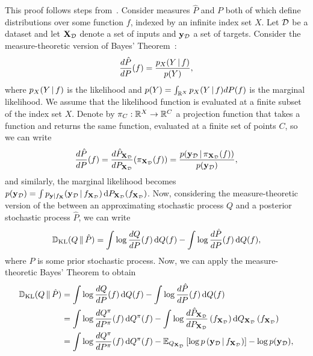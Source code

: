 \begin{appendices}
This proof follows steps from~\citet{matthews2016kld}.
Consider measures $\hat{P}$ and $P$ both of which define distributions over some function $f$, indexed by an infinite index set $X$.
Let $\mathcal{D}$ be a dataset and let $\mathbf X_{\mathcal{D}}$ denote a set of inputs and $\mathbf y_{\mathcal{D}}$ a set of targets.
Consider the measure-theoretic version of Bayes' Theorem~\citep{schervish1995theory}:
\begin{align}
    \frac{d \hat{P}}{d P}(f)=\frac{p_{X}(Y \,|\, f)}{p(Y)},
\end{align}
where $p_{X}(Y \,|\, f)$ is the likelihood and $p(Y) = \int_{\mathbb{R}^X} p_{X}(Y \,|\, f) dP(f)$ is the marginal likelihood.
We assume that the likelihood function is evaluated at a finite subset of the index set $X$.
Denote by $\pi_{C}: \mathbb{R}^{X} \to \mathbb{R}^{C}$ a projection function that takes a function and returns the same function, evaluated at a finite set of points $C$, so we can write
\begin{align}
    \frac{d \hat{P}}{d P}(f)
    =
    \frac{d \hat{P}_{\mathbf X_{\mathcal{D}}}}{d P_{\mathbf X_{\mathcal{D}}}}(\pi_{\mathbf X_{\mathcal{D}}}(f))
    =
    \frac{p(\mathbf y_{\mathcal{D}} \,|\, \pi_{\mathbf X_{\mathcal{D}}}(f))}{p(\mathbf y_{\mathcal{D}})},
\end{align}
and similarly, the marginal likelihood becomes $p(\mathbf y_{\mathcal{D}}) = \int p_{\mathbf y | f_{\mathbf X}}(\mathbf y_{\mathcal{D}} \,|\, f_{\mathbf X_{\mathcal{D}}}) \,\textrm{d} P_{\mathbf X_{\mathcal{D}}}(f_{\mathbf X_{\mathcal{D}}}) $.
Now, considering the measure-theoretic version of the \kld between an approximating stochastic process $Q$ and a posterior stochastic process $\hat{P}$, we can write
\begin{align}
    \mathbb{D}_{\textrm{KL}}(Q \,\|\, \hat{P})
    =
    \int \log {\frac{d Q}{d P}(f)} \,\textrm{d} Q(f) - \int \log {\frac{d \hat{P}}{d P}(f)} \,\textrm{d} Q(f),
\end{align}
where $P$ is some prior stochastic process.
Now, we can apply the measure-theoretic Bayes' Theorem to obtain
\begin{align}
    \mathbb{D}_{\textrm{KL}}(Q \,\|\, \hat{P})
    &=
    \int \log {\frac{d Q}{d P}(f)} \,\textrm{d} Q(f) - \int \log {\frac{d \hat{P}}{d P}(f)} \,\textrm{d} Q(f)
    \\
    &=
    \int \log {\frac{d Q^{\pi}}{d P^{\pi}}(f)} \,\textrm{d} Q^{\pi}(f) - \int \log {\frac{d \hat{P}_{\mathbf X_{\mathcal{D}}}}{d P_{\mathbf X_{\mathcal{D}}}}\left(f_{\mathbf X_{\mathcal{D}}}\right)} \,\textrm{d} Q_{\mathbf X_{\mathcal{D}}}\left(f_{\mathbf X_{\mathcal{D}}}\right)
    \\
    &=
    \int \log {\frac{d Q^{\pi}}{d P^{\pi}}(f)} \,\textrm{d} Q^{\pi}(f) - \operatorname{\mathbb{E}}_{Q_{\mathbf X_{\mathcal{D}}}}\left[\log p\left(\mathbf y_{\mathcal{D}} \,|\, f_{\mathbf X_{\mathcal{D}}}\right)\right]-\log p(\mathbf y_{\mathcal{D}}),
\end{align}

\end{appendices}
